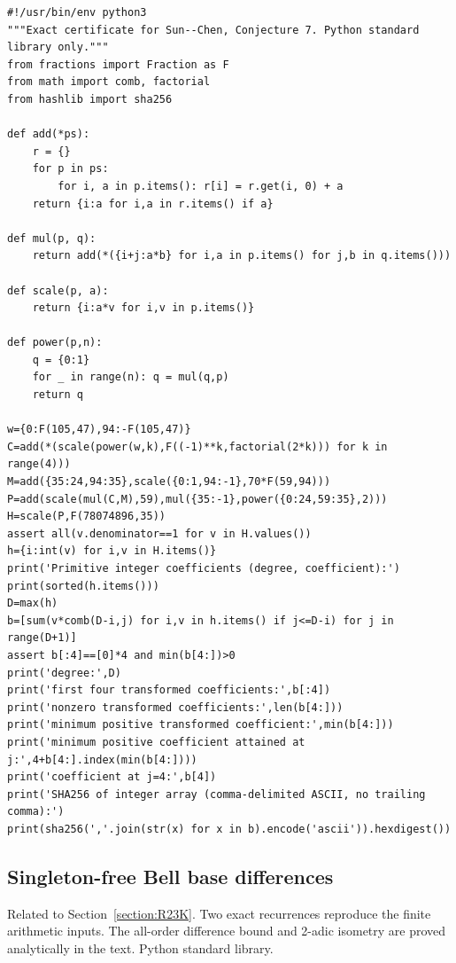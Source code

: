 \documentclass[11pt,a4paper]{article}
\begin{document}
\begin{Verbatim}[fontsize=\scriptsize,breaklines,breakanywhere]
#!/usr/bin/env python3
"""Exact certificate for Sun--Chen, Conjecture 7. Python standard library only."""
from fractions import Fraction as F
from math import comb, factorial
from hashlib import sha256

def add(*ps):
    r = {}
    for p in ps:
        for i, a in p.items(): r[i] = r.get(i, 0) + a
    return {i:a for i,a in r.items() if a}

def mul(p, q):
    return add(*({i+j:a*b} for i,a in p.items() for j,b in q.items()))

def scale(p, a):
    return {i:a*v for i,v in p.items()}

def power(p,n):
    q = {0:1}
    for _ in range(n): q = mul(q,p)
    return q

w={0:F(105,47),94:-F(105,47)}
C=add(*(scale(power(w,k),F((-1)**k,factorial(2*k))) for k in range(4)))
M=add({35:24,94:35},scale({0:1,94:-1},70*F(59,94)))
P=add(scale(mul(C,M),59),mul({35:-1},power({0:24,59:35},2)))
H=scale(P,F(78074896,35))
assert all(v.denominator==1 for v in H.values())
h={i:int(v) for i,v in H.items()}
print('Primitive integer coefficients (degree, coefficient):')
print(sorted(h.items()))
D=max(h)
b=[sum(v*comb(D-i,j) for i,v in h.items() if j<=D-i) for j in range(D+1)]
assert b[:4]==[0]*4 and min(b[4:])>0
print('degree:',D)
print('first four transformed coefficients:',b[:4])
print('nonzero transformed coefficients:',len(b[4:]))
print('minimum positive transformed coefficient:',min(b[4:]))
print('minimum positive coefficient attained at j:',4+b[4:].index(min(b[4:])))
print('coefficient at j=4:',b[4])
print('SHA256 of integer array (comma-delimited ASCII, no trailing comma):')
print(sha256(','.join(str(x) for x in b).encode('ascii')).hexdigest())
\end{Verbatim}
\subsection{Singleton-free Bell base differences}
\noindent Related to Section~\ref{section:R23K}. Two exact recurrences reproduce the finite arithmetic inputs. The all-order difference bound and 2-adic isometry are proved analytically in the text. Python standard library.
\end{document}
